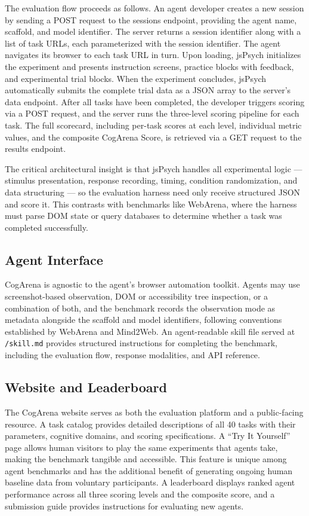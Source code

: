 \documentclass{article}
\begin{document}
The evaluation flow proceeds as follows. An agent developer creates a new session by sending a POST request to the sessions endpoint, providing the agent name, scaffold, and model identifier. The server returns a session identifier along with a list of task URLs, each parameterized with the session identifier. The agent navigates its browser to each task URL in turn. Upon loading, jsPsych initializes the experiment and presents instruction screens, practice blocks with feedback, and experimental trial blocks. When the experiment concludes, jsPsych automatically submits the complete trial data as a JSON array to the server's data endpoint. After all tasks have been completed, the developer triggers scoring via a POST request, and the server runs the three-level scoring pipeline for each task. The full scorecard, including per-task scores at each level, individual metric values, and the composite CogArena Score, is retrieved via a GET request to the results endpoint.

The critical architectural insight is that jsPsych handles all experimental logic --- stimulus presentation, response recording, timing, condition randomization, and data structuring --- so the evaluation harness need only receive structured JSON and score it. This contrasts with benchmarks like WebArena, where the harness must parse DOM state or query databases to determine whether a task was completed successfully.

\subsection{Agent Interface}

CogArena is agnostic to the agent's browser automation toolkit. Agents may use screenshot-based observation, DOM or accessibility tree inspection, or a combination of both, and the benchmark records the observation mode as metadata alongside the scaffold and model identifiers, following conventions established by WebArena and Mind2Web. An agent-readable skill file served at \texttt{/skill.md} provides structured instructions for completing the benchmark, including the evaluation flow, response modalities, and API reference.

\subsection{Website and Leaderboard}

The CogArena website serves as both the evaluation platform and a public-facing resource. A task catalog provides detailed descriptions of all 40 tasks with their parameters, cognitive domains, and scoring specifications. A ``Try It Yourself'' page allows human visitors to play the same experiments that agents take, making the benchmark tangible and accessible. This feature is unique among agent benchmarks and has the additional benefit of generating ongoing human baseline data from voluntary participants. A leaderboard displays ranked agent performance across all three scoring levels and the composite score, and a submission guide provides instructions for evaluating new agents.
\end{document}
